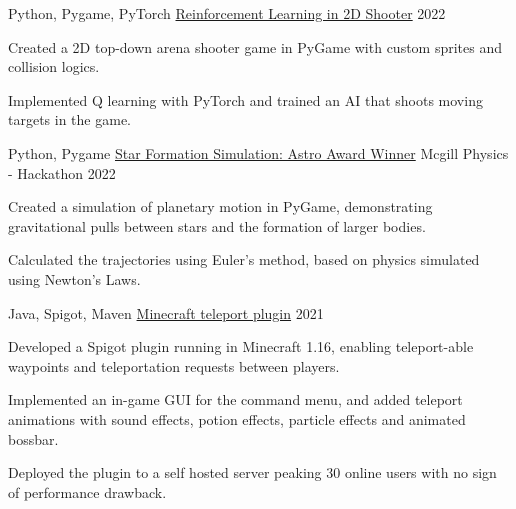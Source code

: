 

\begin{cventries}

  \cventry
    {Python, Pygame, PyTorch} %
    {\href{https://github.com/shiqui/TSDP-Reinforcement-Learning-in-Video-Games}{Reinforcement Learning in 2D Shooter}} %
    {} %
    {2022} %
    {
      \begin{cvitems} %
        \item {Created a 2D top-down arena shooter game in PyGame with custom sprites and collision logics.}
        \item {Implemented Q learning with PyTorch and trained an AI that shoots moving targets in the game.}
      \end{cvitems}
    }

  \cventry
    {Python, Pygame} %
    {\href{https://devpost.com/software/star-formation}{Star Formation Simulation: Astro Award Winner}} %
    {Mcgill Physics - Hackathon} %
    {2022} %
    {
      \begin{cvitems} %
        \item {Created a simulation of planetary motion in PyGame, demonstrating gravitational pulls between stars and the formation of larger bodies.}
        \item {Calculated the trajectories using Euler's method, based on physics simulated using Newton's Laws.}
      \end{cvitems}
    }
    
  \cventry
    {Java, Spigot, Maven} %
    {\href{https://github.com/shiqui/Teleport-Plugin}{Minecraft teleport plugin}} %
    {} %
    {2021} %
    {
      \begin{cvitems} %
        \item {Developed a Spigot plugin running in Minecraft 1.16, enabling teleport-able waypoints and teleportation requests between players.}
        \item {Implemented an in-game GUI for the command menu, and added teleport animations with sound effects, potion effects, particle effects and animated bossbar.}
        \item {Deployed the plugin to a self hosted server peaking 30 online users with no sign of performance drawback.}
      \end{cvitems}
    }


\end{cventries}
